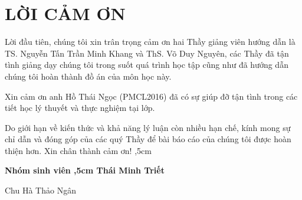 \documentclass[12pt,a4paper,oneside]{book}
\begin{document}
\newpage

\newpage
\def\@chapter[#1]#2{\ifnum \c@secnumdepth >\m@ne
                       \if@mainmatter
                         \refstepcounter{chapter}%
                         \typeout{\@chapapp\space\thechapter.}%
                         \addcontentsline{toc}{chapter}%
                              {\bf  Chương \protect\numberline{\thechapter. } #1}%
                       \else
                         \addcontentsline{toc}{chapter}{ #1}%
                       \fi
                    \else
                      \addcontentsline{toc}{chapter}{ #1}%
                    \fi
                    \chaptermark{#1}%
                    \addtocontents{lof}{\protect\addvspace{10\p@}}%
                    \addtocontents{lot}{\protect\addvspace{10\p@}}%
                    \if@twocolumn
                      \@topnewpage[\@makechapterhead{#2}]%
                    \else
                      \@makechapterhead{#2}%
                      \@afterheading
                    \fi}
\tableofcontents
{}

\makeatletter
{}%
\makeatother

\renewcommand*{\listfigurename}{DANH MỤC HÌNH ẢNH}
\listoffigures
\thispagestyle{empty}

\renewcommand*{\listtablename}{DANH MỤC BẢNG BIỂU}
\listoftables
\thispagestyle{empty}

\pagestyle{plain}
\chapter*{LỜI CẢM ƠN}
	Lời đầu tiên, chúng tôi xin trân trọng cảm ơn hai Thầy giảng viên hướng dẫn là TS. Nguyễn Tấn Trần Minh Khang và ThS. Võ Duy Nguyên, các Thầy đã tận tình giảng dạy chúng tôi trong suốt quá trình học tập cũng như đã hướng dẫn chúng tôi hoàn thành đồ án của môn học này.
	
	Xin cảm ơn anh Hồ Thái Ngọc (PMCL2016) đã có sự giúp đỡ tận tình trong các tiết học lý thuyết và thực nghiệm tại lớp.
	
	Do giới hạn về kiến thức và khả năng lý luận còn nhiều hạn chế, kính mong sự chỉ dẫn và đóng góp của các quý Thầy để bài báo cáo của chúng tôi được hoàn thiện hơn. Xin chân thành cảm ơn!
	,5cm
	\hskip 9cm {\bf Nhóm sinh viên
	,5cm
	\hskip 9cm Thái Minh Triết
	
	\hskip 8.6cm Chu Hà Thảo Ngân
	}
\end{document}
